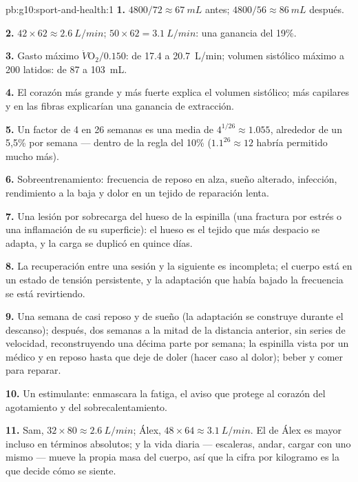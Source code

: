\begin{solution}{pb:g10:sport-and-health:1}
\textbf{1.} $4800/72 \approx \qty{67}{mL}$ antes; $4800/56 \approx
\qty{86}{mL}$ después.

\textbf{2.} $42 \times 62 \approx \qty{2.6}{L/min}$; $50 \times 62 =
\qty{3.1}{L/min}$: una ganancia del 19\%.

\textbf{3.} Gasto máximo $\dot V\!\mathrm{O_2}/0.150$: de \num{17.4} a
\qty{20.7}{L/min}; volumen sistólico máximo a 200 latidos: de \num{87}
a \qty{103}{mL}.

\textbf{4.} El corazón más grande y más fuerte explica el volumen
sistólico; más capilares y  en las fibras explicarían una
ganancia de extracción.

\textbf{5.} Un factor de 4 en 26 semanas es una media de $4^{1/26}
\approx 1.055$, alrededor de un 5,5\% por semana --- dentro de la regla
del 10\% ($1.1^{26}
\approx 12$ habría permitido mucho más).

\textbf{6.} Sobreentrenamiento: frecuencia de reposo en alza, sueño
alterado, infección, rendimiento a la baja y dolor en un tejido de
reparación lenta.

\textbf{7.} Una lesión por sobrecarga del hueso de la espinilla (una
fractura por estrés o una inflamación de su superficie): el hueso es el
tejido que más despacio se adapta, y la carga se duplicó en quince
días.

\textbf{8.} La recuperación entre una sesión y la siguiente es
incompleta; el cuerpo está en un estado de tensión persistente, y la
adaptación que había bajado la frecuencia se está revirtiendo.

\textbf{9.} Una semana de casi reposo y de sueño (la adaptación se
construye durante el descanso); después, dos semanas a la mitad de la
distancia anterior, sin series de velocidad, reconstruyendo una décima
parte por semana; la espinilla vista por un médico y en reposo hasta
que deje de doler (hacer caso al dolor); beber y comer para reparar.

\textbf{10.} Un estimulante: enmascara la fatiga, el aviso que protege
al corazón del agotamiento y del sobrecalentamiento.

\textbf{11.} Sam, $32 \times 80 \approx \qty{2.6}{L/min}$; Álex, $48
\times 64 \approx \qty{3.1}{L/min}$. El de Álex es mayor incluso en
términos absolutos; y la vida diaria --- escaleras, andar, cargar con
uno mismo --- mueve la propia masa del cuerpo, así que la cifra por
kilogramo es la que decide cómo se siente.


\end{solution}
